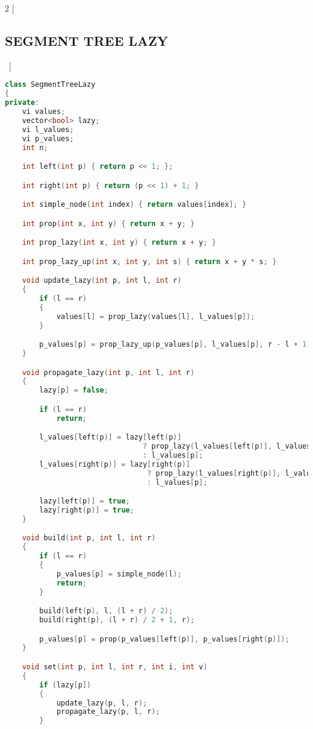 \documentclass[leter]{amsart}
\begin{document}
\begin{multicols}{2}
[\subsection{SEGMENT TREE LAZY}\ ]
\begin{lstlisting}[language=C++]
class SegmentTreeLazy
{
private:
    vi values;
    vector<bool> lazy;
    vi l_values;
    vi p_values;
    int n;

    int left(int p) { return p << 1; };

    int right(int p) { return (p << 1) + 1; }

    int simple_node(int index) { return values[index]; }

    int prop(int x, int y) { return x + y; }

    int prop_lazy(int x, int y) { return x + y; }

    int prop_lazy_up(int x, int y, int s) { return x + y * s; }

    void update_lazy(int p, int l, int r)
    {
        if (l == r)
        {
            values[l] = prop_lazy(values[l], l_values[p]);
        }

        p_values[p] = prop_lazy_up(p_values[p], l_values[p], r - l + 1);
    }

    void propagate_lazy(int p, int l, int r)
    {
        lazy[p] = false;

        if (l == r)
            return;

        l_values[left(p)] = lazy[left(p)]
                                ? prop_lazy(l_values[left(p)], l_values[p])
                                : l_values[p];
        l_values[right(p)] = lazy[right(p)]
                                 ? prop_lazy(l_values[right(p)], l_values[p])
                                 : l_values[p];

        lazy[left(p)] = true;
        lazy[right(p)] = true;
    }

    void build(int p, int l, int r)
    {
        if (l == r)
        {
            p_values[p] = simple_node(l);
            return;
        }

        build(left(p), l, (l + r) / 2);
        build(right(p), (l + r) / 2 + 1, r);

        p_values[p] = prop(p_values[left(p)], p_values[right(p)]);
    }

    void set(int p, int l, int r, int i, int v)
    {
        if (lazy[p])
        {
            update_lazy(p, l, r);
            propagate_lazy(p, l, r);
        }


\end{lstlisting}
\end{multicols}
\end{document}
